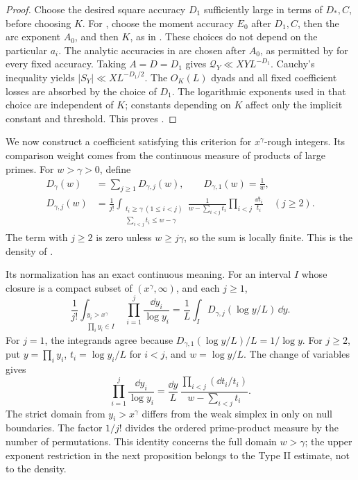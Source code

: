 \begin{proof}
Choose the desired square accuracy \(D_1\) sufficiently large in terms
of \(D_*,C\), before choosing \(K\).  For
, choose the moment accuracy \(E_0\)
after \(D_1,C\), then the arc exponent \(A_0\), and then \(K\), as in
\cite[Proposition~4.1]{PoissonDirichlet}.  These choices do not depend
on the particular \(a_i\).  The analytic accuracies in
 are chosen after \(A_0\), as permitted
by  for every fixed
accuracy.  Taking \(A=D=D_1\) gives
\(\mathcal Q_Y\ll XYL^{-D_1}\).  Cauchy's inequality yields
\(|S_Y|\ll XL^{-D_1/2}\).  The \(O_K(L)\) dyads and all fixed
coefficient losses are absorbed by the choice of \(D_1\).  The
logarithmic exponents used in that choice are independent of \(K\);
constants depending on \(K\) affect only the implicit constant and
threshold.  This proves .
\end{proof}

We now construct a coefficient satisfying this criterion for
\(x^\gamma\)-rough integers.  Its comparison weight comes from the
continuous measure of products of large primes.  For \(w>\gamma>0\),
define
\begin{equation}\label{eq:rough-density-definition}
 \begin{split}
 D_\gamma(w)&=\sum_{j\ge1}D_{\gamma,j}(w),
       \qquad D_{\gamma,1}(w)=\frac1w,\\
 D_{\gamma,j}(w)&=\frac1{j!}
  \int_{\substack{t_i\ge\gamma\ (1\le i<j)\\
                   \sum_{i<j}t_i\le w-\gamma}}
  \frac{1}{w-\sum_{i<j}t_i}\prod_{i<j}\frac{\dd t_i}{t_i}
  \quad(j\ge2).
 \end{split}
\end{equation}
The term with \(j\ge2\) is zero unless \(w\ge j\gamma\), so the sum is
locally finite.  This is the density of
\cite[Lemma~7.4]{BlockPaper}.

Its normalization has an exact continuous meaning.  For an interval
\(I\) whose closure is a compact subset of \((x^\gamma,\infty)\), and
each \(j\ge1\),
\begin{equation}\label{eq:rough-density-pushforward}
 \frac1{j!}\int_{\substack{y_i>x^\gamma\\\prod_i y_i\in I}}
                   \prod_{i=1}^j\frac{\dd y_i}{\log y_i}
 =\frac1L\int_I D_{\gamma,j}(\log y/L)\,\dd y.
\end{equation}
For \(j=1\), the integrands agree because
\(D_{\gamma,1}(\log y/L)/L=1/\log y\).  For \(j\ge2\), put
\(y=\prod_i y_i\), \(t_i=\log y_i/L\) for \(i<j\), and
\(w=\log y/L\).  The change of variables gives
\[
 \prod_{i=1}^j\frac{\dd y_i}{\log y_i}
 =\frac{\dd y}{L}\,
   \frac{\prod_{i<j}(\dd t_i/t_i)}{w-\sum_{i<j}t_i}.
\]
The strict domain from \(y_i>x^\gamma\) differs from the weak simplex
in  only on null boundaries.  The
factor \(1/j!\) divides the ordered prime-product measure by the
number of permutations.  This identity concerns the full domain
\(w>\gamma\); the upper exponent restriction in the next proposition
belongs to the Type II estimate, not to the density.

